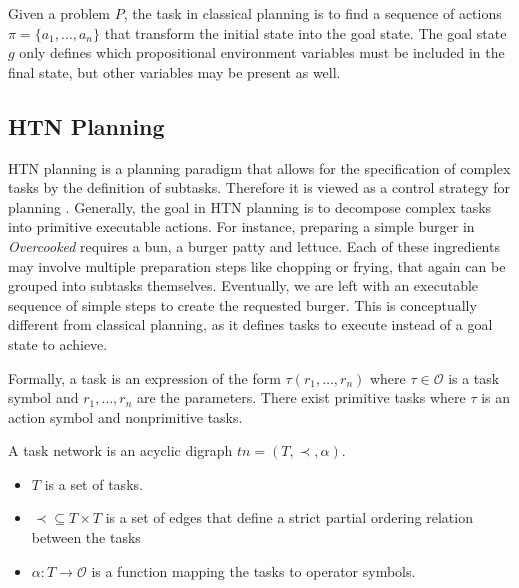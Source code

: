 Given a problem $P$, the task in classical planning is to find a sequence of actions $\pi = \{a_1,\dots,a_n\}$ that transform the initial state into the goal state.
The goal state $g$ only defines which propositional environment variables must be included in the final state, but other variables may be present as well.

\subsection{HTN Planning}\label{sec:htn-planning}

\acf{HTN} planning is a planning paradigm that allows for the specification of complex tasks by the definition of subtasks.
Therefore it is viewed as a control strategy for planning \citep[chap.~11]{ghallabAutomatedPlanningTheory2004}.
Generally, the goal in \ac{HTN} planning is to decompose complex tasks into primitive executable actions.
For instance, preparing a simple burger in \textit{Overcooked} requires a bun, a burger patty and lettuce.
Each of these ingredients may involve multiple preparation steps like chopping or frying, that again can be grouped into subtasks themselves.
Eventually, we are left with an executable sequence of simple steps to create the requested burger.
This is conceptually different from classical planning, as it defines tasks to execute instead of a goal state to achieve.





Formally, a task is an expression of the form $\tau(r_1,\dots,r_n)$ where $\tau \in \mathcal{O}$ is a task symbol and $r_1,\dots,r_n$ are the parameters.
There exist primitive tasks where $\tau$ is an action symbol and nonprimitive tasks.

\begin{definition}
  A task network is an acyclic digraph $tn = (T,\prec,\alpha)$.
  \begin{itemize}
    \item $T$ is a set of tasks.
    \item $\prec \subseteq T \times T$ is a set of edges that define a strict partial ordering relation between the tasks
    \item $\alpha: T \rightarrow \mathcal{O}$ is a function mapping the tasks to operator symbols.
  \end{itemize}
\end{definition}

